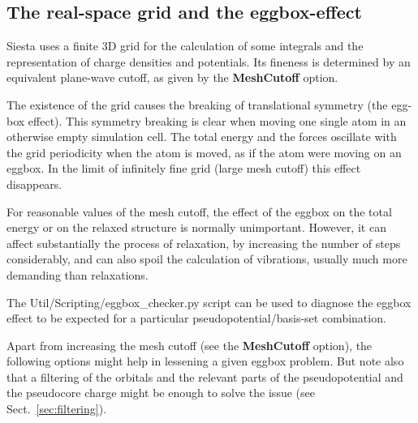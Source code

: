 \documentclass[11pt]{article}
\begin{document}
\vspace{5pt}
\subsection{The real-space grid and the eggbox-effect}

{\sc Siesta} uses a finite 3D grid for the calculation of some
integrals and the representation of charge densities and potentials. 
Its fineness is determined by an equivalent plane-wave cutoff, as
given by the {\bf MeshCutoff} option.

The existence of the grid causes the breaking of translational
symmetry (the egg-box effect).  This symmetry breaking is clear when
moving one single atom in an otherwise empty simulation cell. The
total energy and the forces oscillate with the grid periodicity when
the atom is moved, as if the atom were moving on an eggbox. In the
limit of infinitely fine grid (large mesh cutoff) this effect
disappears.

For reasonable values of the mesh cutoff, the effect of the eggbox 
on the total energy or on the relaxed structure is normally unimportant.
However, it can affect substantially the process of relaxation, by 
increasing the number of steps considerably, and can also spoil the
calculation of vibrations, usually much more demanding than relaxations.

The Util/Scripting/eggbox\_checker.py script can be used to diagnose
the eggbox effect to be expected for a particular
pseudopotential/basis-set combination.

Apart from increasing the mesh cutoff (see the {\bf MeshCutoff} option),
the following options might help in lessening a given eggbox problem. But
note also that a filtering of the orbitals and the relevant parts of
the pseudopotential and the pseudocore charge might be enough to solve
the issue (see Sect.~\ref{sec:filtering}).
\end{document}
